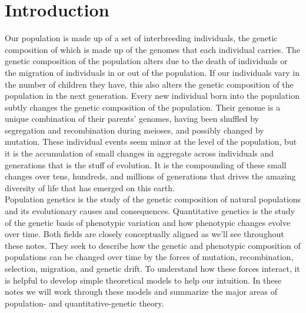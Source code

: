 \chapter{Introduction}
 \cite{DobzhanskyBook} Our population is made up of a set of interbreeding individuals, the genetic composition of which is made up of the  genomes that each individual carries.  %
The genetic composition of the population alters due to the death of individuals or the migration of individuals in or out
of the population. If our individuals vary in the number of children they have, this
also alters the genetic composition of the population in the next generation.
Every new individual born into the population subtly changes the genetic
composition of the population. Their genome is a unique combination of their
parents' genomes, having been shuffled by segregation and recombination during
meioses, and possibly changed by mutation. These individual events seem minor at the level of the population, but it is the accumulation of small changes in aggregate across individuals and generations that is the stuff of evolution. It is the compounding of these small changes over tens, hundreds, and millions of generations that drives the amazing diversity of life that has emerged on this earth.\\

Population genetics is the study of the genetic composition of natural
populations and its evolutionary causes and consequences. Quantitative genetics is the study of the genetic basis of phenotypic variation and how phenotypic changes evolve over time. Both fields are closely conceptually aligned as we'll see throughout these notes. They seek to describe how the genetic and phenotypic composition of populations can be changed over
time by the forces of mutation, recombination, selection, migration, and
genetic drift.  To understand how these forces interact, it is helpful to
develop simple theoretical models to help our intuition. In these notes we will
work through these models and summarize the major areas of population- and quantitative-genetic
theory.\\


